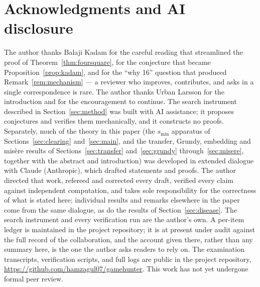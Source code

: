 \section*{Acknowledgments and AI disclosure}
The author thanks Balaji Kadam for the careful reading that streamlined
the proof of Theorem~\ref{thm:foursquare}, for the conjecture that became
Proposition~\ref{prop:kadam}, and for the ``why 16'' question that
produced Remark~\ref{rem:mechanism} --- a reviewer who improves,
contributes, and asks in a single correspondence is rare. The author
thanks Urban Larsson for the introduction and for the encouragement to
continue. The search instrument described in Section~\ref{sec:method} was built
with AI assistance; it proposes conjectures and verifies them
mechanically, and it constructs no proofs. Separately, much of the
theory in this paper (the $s_{\min}$ apparatus of
Sections~\ref{sec:clearing} and~\ref{sec:main}, and the transfer,
Grundy, embedding and mis\`ere results of Sections~\ref{sec:transfer}
and~\ref{sec:grundy} through~\ref{sec:misere}, together with
the abstract and introduction) was developed in extended dialogue
with Claude (Anthropic), which drafted statements and proofs. The author
directed that work, refereed and corrected every draft, verified every
claim against independent computation, and takes sole responsibility for
the correctness of what is stated here; individual results and remarks
elsewhere in the paper come from the same dialogue, as do the results of
Section~\ref{sec:disease}. The search instrument and every verification
run are the author's own. A per-item ledger is maintained in the project
repository; it is at present under audit against the full record of the
collaboration, and the account given there, rather than any summary here,
is the one the author asks readers to rely on.
The examination transcripts, verification scripts, and full logs are
public in the project repository,
\url{https://github.com/hamzagul07/gamehunter}. This work has not yet
undergone formal peer review.

